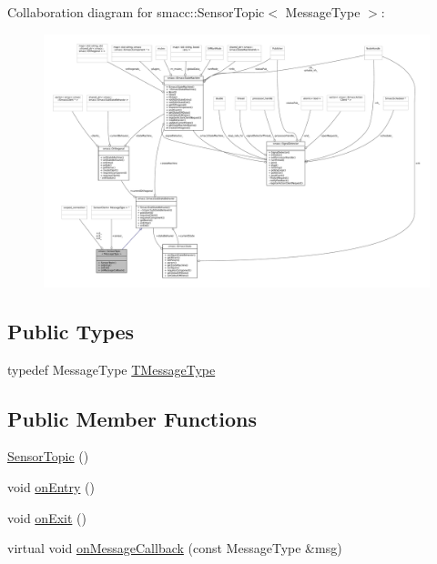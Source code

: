 Collaboration diagram for smacc\+:\+:Sensor\+Topic$<$ Message\+Type $>$\+:
\nopagebreak
\begin{figure}[H]
\begin{center}
\leavevmode
\includegraphics[width=350pt]{classsmacc_1_1SensorTopic__coll__graph}
\end{center}
\end{figure}
\subsection*{Public Types}
\begin{DoxyCompactItemize}
\item 
typedef Message\+Type \hyperlink{classsmacc_1_1SensorTopic_a5ba13cdfe30513184afe37aeaa5bbe88}{T\+Message\+Type}
\end{DoxyCompactItemize}
\subsection*{Public Member Functions}
\begin{DoxyCompactItemize}
\item 
\hyperlink{classsmacc_1_1SensorTopic_a0b58c3efc7254341a8fb7b47605c0096}{Sensor\+Topic} ()
\item 
void \hyperlink{classsmacc_1_1SensorTopic_a27fe3515e3981a5a393dea193902cbd0}{on\+Entry} ()
\item 
void \hyperlink{classsmacc_1_1SensorTopic_a2c24a982994de572831b5fa67e5df417}{on\+Exit} ()
\item 
virtual void \hyperlink{classsmacc_1_1SensorTopic_a1160ef981ab390d75d862a6067615e41}{on\+Message\+Callback} (const Message\+Type \&msg)
\end{DoxyCompactItemize}
